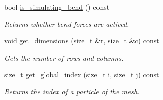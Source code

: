 \begin{DoxyCompactItemize}
bool \hyperlink{classphysim_1_1meshes_1_1mesh2d__regular_a9410509a30c8416a11bc50d34820bafe}{is\+\_\+simulating\+\_\+bend} () const
\begin{DoxyCompactList}\small\item\em Returns whether bend forces are actived. \end{DoxyCompactList}\item 
void \hyperlink{classphysim_1_1meshes_1_1mesh2d__regular_a26fcf2ed9c0532a33e524a5f1728dbdf}{get\+\_\+dimensions} (size\+\_\+t \&r, size\+\_\+t \&c) const
\begin{DoxyCompactList}\small\item\em Gets the number of rows and columns. \end{DoxyCompactList}\item 
size\+\_\+t \hyperlink{classphysim_1_1meshes_1_1mesh2d__regular_a9ba9ff2e69bfcdb38a6362f35dbb1ba4}{get\+\_\+global\+\_\+index} (size\+\_\+t i, size\+\_\+t j) const
\begin{DoxyCompactList}\small\item\em Returns the index of a particle of the mesh. \end{DoxyCompactList}\end{DoxyCompactItemize}
